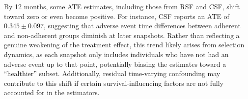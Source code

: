 


By 12 months, some ATE estimates, including those from RSF and CSF, shift toward zero or even become positive. 
For instance, CSF reports an ATE of \(0.345 \pm 0.097\), suggesting that adverse event time differences between adherent and non-adherent groups diminish at later snapshots. 
Rather than reflecting a genuine weakening of the treatment effect, this trend likely arises from selection dynamics, as each snapshot only includes individuals who have not had an adverse event up to that point, potentially biasing the estimates toward a ``healthier'' subset. 
Additionally, residual time-varying confounding may contribute to this shift if certain survival-influencing factors are not fully accounted for in the estimators.

